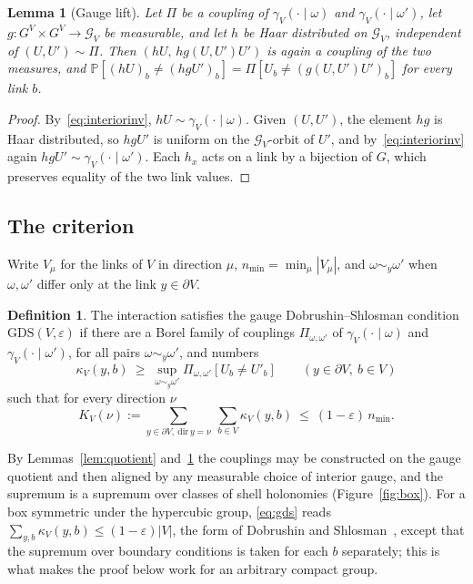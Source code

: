 \documentclass[11pt]{amsart}
\newtheorem{lemma}[theorem]{Lemma}
\theoremstyle{definition}
\newtheorem{definition}[theorem]{Definition}
\theoremstyle{remark}
\begin{document}
\begin{lemma}[Gauge lift]\label{lem:lift}
Let $\Pi$ be a coupling of $\gamma_V(\cdot\mid\omega)$ and
$\gamma_V(\cdot\mid\omega')$, let $g\colon G^V\times G^V\to\mathcal G_V$ be
measurable, and let $h$ be Haar distributed on $\mathcal G_V$, independent of
$(U,U')\sim\Pi$. Then $(hU,\,hg(U,U')U')$ is again a coupling of the two
measures, and $\mathbb P[(hU)_b\ne(hgU')_b]=\Pi[U_b\ne(g(U,U')U')_b]$ for every
link $b$.
\end{lemma}

\begin{proof}
By~\eqref{eq:interiorinv}, $hU\sim\gamma_V(\cdot\mid\omega)$. Given $(U,U')$,
the element $hg$ is Haar distributed, so $hgU'$ is uniform on the
$\mathcal G_V$-orbit of $U'$, and by~\eqref{eq:interiorinv} again
$hgU'\sim\gamma_V(\cdot\mid\omega')$. Each $h_x$ acts on a link by a bijection
of $G$, which preserves equality of the two link values.
\end{proof}

\subsection{The criterion}

Write $V_\mu$ for the links of $V$ in direction $\mu$, $n_{\min}=\min_\mu
|V_\mu|$, and $\omega\sim_y\omega'$ when $\omega,\omega'$ differ only at the link
$y\in\partial V$.

\begin{definition}\label{def:gds}
The interaction satisfies the gauge Dobrushin--Shlosman condition
$\mathrm{GDS}(V,\varepsilon)$ if there are a Borel family of couplings
$\Pi_{\omega,\omega'}$ of $\gamma_V(\cdot\mid\omega)$ and
$\gamma_V(\cdot\mid\omega')$, for all pairs $\omega\sim_y\omega'$, and numbers
\[
\kappa_V(y,b)\ \ge\ \sup_{\omega\sim_y\omega'}\Pi_{\omega,\omega'}[U_b\ne U'_b]
\qquad(y\in\partial V,\ b\in V)
\]
such that for every direction $\nu$
\begin{equation}\label{eq:gds}
K_V(\nu):=\sum_{y\in\partial V,\ \mathrm{dir}\,y=\nu}\ \sum_{b\in V}
\kappa_V(y,b)\ \le\ (1-\varepsilon)\,n_{\min}.
\end{equation}
\end{definition}

By Lemmas~\ref{lem:quotient} and~\ref{lem:lift} the couplings may be
constructed on the gauge quotient and then aligned by any measurable choice of
interior gauge, and the supremum is a supremum over classes of shell holonomies
(Figure~\ref{fig:box}). For a box symmetric under the hypercubic group,
\eqref{eq:gds} reads $\sum_{y,b}\kappa_V(y,b)\le(1-\varepsilon)|V|$, the form
of Dobrushin and Shlosman~\cite{DS85}, except that the supremum over boundary
conditions is taken for each $b$ separately; this is what makes the proof below
work for an arbitrary compact group.
\end{document}

